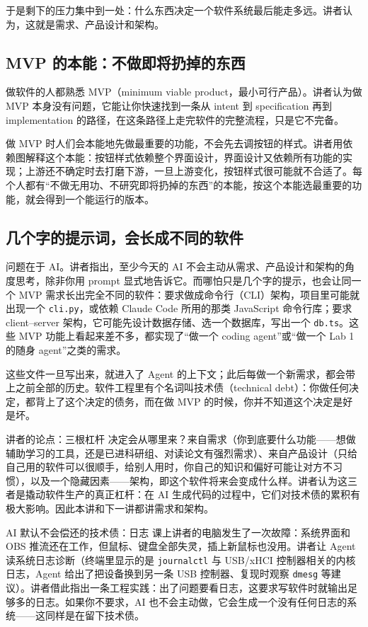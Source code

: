 \documentclass[a4paper]{article}
\begin{document}
于是剩下的压力集中到一处：什么东西决定一个软件系统最后能走多远。讲者认为，这就是需求、产品设计和架构。

\subsection{MVP 的本能：不做即将扔掉的东西}

做软件的人都熟悉 MVP（minimum viable product，最小可行产品）。讲者认为做 MVP 本身没有问题，它能让你快速找到一条从 intent 到 specification 再到 implementation 的路径，在这条路径上走完软件的完整流程，只是它不完备。

做 MVP 时人们会本能地先做最重要的功能，不会先去调按钮的样式。讲者用依赖图解释这个本能：按钮样式依赖整个界面设计，界面设计又依赖所有功能的实现；上游还不确定时去打磨下游，一旦上游变化，按钮样式很可能就不合适了。每个人都有“不做无用功、不研究即将扔掉的东西”的本能，按这个本能选最重要的功能，就会得到一个能运行的版本。

\subsection{几个字的提示词，会长成不同的软件}

问题在于 AI。讲者指出，至少今天的 AI 不会主动从需求、产品设计和架构的角度思考，除非你用 prompt 显式地告诉它。而哪怕只是几个字的提示，也会让同一个 MVP 需求长出完全不同的软件：要求做成命令行（CLI）架构，项目里可能就出现一个 \texttt{cli.py}，或依赖 Claude Code 所用的那类 JavaScript 命令行库；要求 client–server 架构，它可能先设计数据存储、选一个数据库，写出一个 \texttt{db.ts}。这些 MVP 功能上看起来差不多，都实现了“做一个 coding agent”或“做一个 Lab 1 的随身 agent”之类的需求。

这些文件一旦写出来，就进入了 Agent 的上下文；此后每做一个新需求，都会带上之前全部的历史。软件工程里有个名词叫技术债（technical debt）：你做任何决定，都背上了这个决定的债务，而在做 MVP 的时候，你并不知道这个决定是好是坏。

\begin{importantbox}{讲者的论点：三根杠杆}
决定会从哪里来？来自需求（你到底要什么功能——想做辅助学习的工具，还是已进科研组、对读论文有强烈需求）、来自产品设计（只给自己用的软件可以很顺手，给别人用时，你自己的知识和偏好可能让对方不习惯），以及一个隐藏因素——架构，即这个软件将来会变成什么样。讲者认为这三者是撬动软件生产的真正杠杆：在 AI 生成代码的过程中，它们对技术债的累积有极大影响。因此本讲和下一讲都讲需求和架构。
\end{importantbox}

\begin{warningbox}{AI 默认不会偿还的技术债：日志}
课上讲者的电脑发生了一次故障：系统界面和 OBS 推流还在工作，但鼠标、键盘全部失灵，插上新鼠标也没用。讲者让 Agent 读系统日志诊断（终端里显示的是 \texttt{journalctl} 与 USB/xHCI 控制器相关的内核日志，Agent 给出了把设备换到另一条 USB 控制器、复现时观察 \texttt{dmesg} 等建议）。讲者借此指出一条工程实践：出了问题要看日志，这要求写软件时就输出足够多的日志。如果你不要求，AI 也不会主动做，它会生成一个没有任何日志的系统——这同样是在留下技术债。
\end{warningbox}
\end{document}
